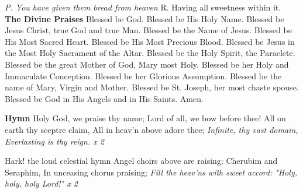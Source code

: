 \documentclass{article}
\begin{document}
\begin{flushleft}
\begin{multicols}{2}
\textit{P. You have given them bread from heaven}\newline
R. Having all sweetness within it.\newline
\vfill\null
\columnbreak
\textbf{The Divine Praises}\newline
Blessed be God. \newline
Blessed be His Holy Name. \newline
Blessed be Jesus Christ, true God and true Man. \newline
Blessed be the Name of Jesus.\newline
Blessed be His Most Sacred Heart.\newline
Blessed be His Most Precious Blood.\newline
Blessed be Jesus in the Most Holy Sacrament of the Altar.\newline
Blessed be the Holy Spirit, the Paraclete.\newline
Blessed be the great Mother of God, Mary most Holy.\newline
Blessed be her Holy and Immaculate Conception.\newline
Blessed be her Glorious Assumption.\newline
Blessed be the name of Mary, Virgin and Mother.\newline
Blessed be St. Joseph, her most chaste spouse.\newline
Blessed be God in His Angels and in His Saints.\newline
Amen.\newline
\end{multicols}
\textbf{Hymn}\newline
Holy God, we praise thy name;\newline
Lord of all, we bow before thee!\newline
All on earth thy sceptre claim,\newline
All in heav'n above adore thee;\newline
\textit{Infinite, thy vast domain,}\newline
\textit{Everlasting is thy reign. x 2}\newline

Hark! the loud celestial hymn\newline
Angel choirs above are raising;\newline
Cherubim and Seraphim,\newline
In unceasing chorus praising;\newline
\textit{Fill the heav'ns with sweet accord:}\newline
\textit{"Holy, holy, holy Lord!" x 2}\newline
\end{flushleft}
\end{document}
